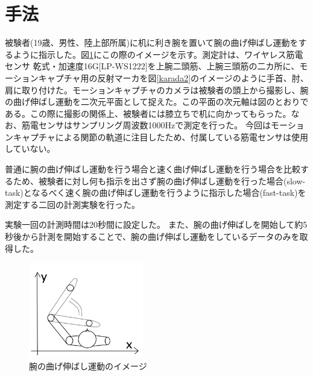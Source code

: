 \documentclass{jsarticle}
\begin{document}
\section{手法}
被験者(19歳、男性、陸上部所属)に机に利き腕を置いて腕の曲げ伸ばし運動をするように指示した。図\ref{karada1}にこの際のイメージを示す。測定計は、ワイヤレス筋電センサ 乾式・加速度16G[LP-WS1222]を上腕二頭筋、上腕三頭筋の二カ所に、モーションキャプチャ用の反射マーカを図\ref{karada2}のイメージのように手首、肘、肩に取り付けた。モーションキャプチャのカメラは被験者の頭上から撮影し、腕の曲げ伸ばし運動を二次元平面として捉えた。この平面の次元軸は図のとおりである。この際に撮影の関係上、被験者には膝立ちで机に向かってもらった。なお、筋電センサはサンプリング周波数1000Hzで測定を行った。
今回はモーションキャプチャによる関節の軌道に注目したため、付属している筋電センサは使用していない。

普通に腕の曲げ伸ばし運動を行う場合と速く曲げ伸ばし運動を行う場合を比較するため、被験者に対し何も指示を出さず腕の曲げ伸ばし運動を行った場合(slow-task)となるべく速く腕の曲げ伸ばし運動を行うように指示した場合(fast-task)を測定する二回の計測実験を行った。

実験一回の計測時間は20秒間に設定した。
また、腕の曲げ伸ばしを開始して約5秒後から計測を開始することで、腕の曲げ伸ばし運動をしているデータのみを取得した。

\begin{figure}[htb]
  \begin{center}
    \includegraphics[width=5cm]{karada1.png}
    \caption{腕の曲げ伸ばし運動のイメージ}
    \label{karada1}
  \end{center}
\end{figure}

\end{document}
